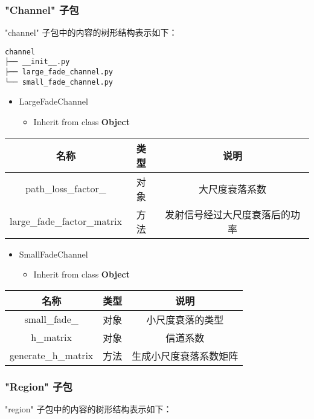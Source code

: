 \documentclass[11pt]{article}
\providecommand{\tightlist}{%
      \setlength{\itemsep}{0pt}\setlength{\parskip}{0pt}}
\begin{document}
    \subsubsection{"Channel" 子包}\label{channel-ux5b50ux5305}

"channel" 子包中的内容的树形结构表示如下：

\begin{verbatim}
channel
├── __init__.py
├── large_fade_channel.py
└── small_fade_channel.py
\end{verbatim}

\begin{itemize}
\tightlist
\item
  LargeFadeChannel

  \begin{itemize}
  \tightlist
  \item
    Inherit from class \textbf{Object}
  \end{itemize}
\end{itemize}

\begin{longtable}[c]{@{}ccc@{}}
\toprule
名称 & 类型 & 说明\tabularnewline
\midrule
\endhead
path\_loss\_factor\_ & 对象 & 大尺度衰落系数\tabularnewline
large\_fade\_factor\_matrix & 方法 &
发射信号经过大尺度衰落后的功率\tabularnewline
\bottomrule
\end{longtable}

\begin{itemize}
\tightlist
\item
  SmallFadeChannel

  \begin{itemize}
  \tightlist
  \item
    Inherit from class \textbf{Object}
  \end{itemize}
\end{itemize}

\begin{longtable}[c]{@{}ccc@{}}
\toprule
名称 & 类型 & 说明\tabularnewline
\midrule
\endhead
small\_fade\_ & 对象 & 小尺度衰落的类型\tabularnewline
h\_matrix & 对象 & 信道系数\tabularnewline
generate\_h\_matrix & 方法 & 生成小尺度衰落系数矩阵\tabularnewline
\bottomrule
\end{longtable}

    \subsubsection{"Region" 子包}\label{region-ux5b50ux5305}

"region" 子包中的内容的树形结构表示如下：
\end{document}
